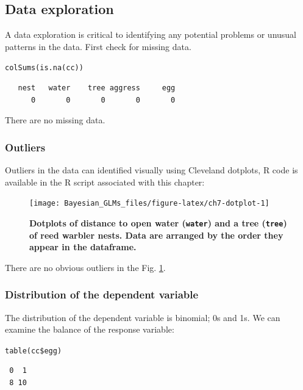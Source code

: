 \documentclass[
]{book}
\begin{document}
\hypertarget{cc-eda}{%
\subsection{Data exploration}\label{cc-eda}}

A data exploration is critical to identifying any potential problems or unusual patterns in the data. First check for missing data.

\texttt{colSums(is.na(cc))}

\begin{verbatim}
   nest   water    tree aggress     egg 
      0       0       0       0       0 
\end{verbatim}

There are no missing data.

\hypertarget{cc-outliers}{%
\subsubsection{Outliers}\label{cc-outliers}}

Outliers in the data can identified visually using Cleveland dotplots, R code is available in the R script associated with this chapter:



\begin{figure}

{\centering \texttt{[image: Bayesian\_GLMs\_files/figure-latex/ch7-dotplot-1]} 

}

\caption{\textbf{Dotplots of distance to open water (\texttt{water}) and a tree (\texttt{tree}) of reed warbler nests. Data are arranged by the order they appear in the dataframe.}}\label{fig:ch7-dotplot}
\end{figure}

There are no obvious outliers in the Fig. \ref{fig:ch7-dotplot}.

\hypertarget{bern-dist}{%
\subsubsection{Distribution of the dependent variable}\label{bern-dist}}

The distribution of the dependent variable is binomial; 0s and 1s. We can examine the balance of the response variable:

\texttt{table(cc\$egg)}

\begin{verbatim}
 0  1 
 8 10 
\end{verbatim}
\end{document}
